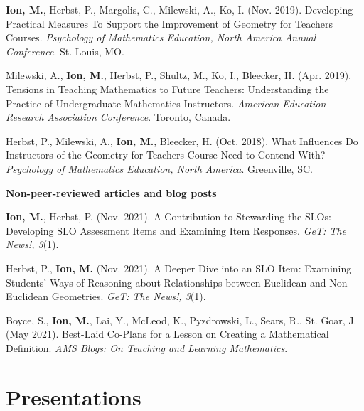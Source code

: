 \documentclass[margin,line]{res}
\newenvironment{list3}{
        \begin{list}{\ding{113}}{%
            \setlength{\itemsep}{0in}
            \setlength{\parsep}{0in} \setlength{\parskip}{0in}
            \setlength{\topsep}{0in} \setlength{\partopsep}{0in}
            \setlength{\leftmargin}{0in}
            \setlength{\rightmargin}{1.25in}}}{\end{list}}
\renewcommand{\subsection}[1]{%
      \par\vspace{3pt}%
      \underline{\normalsize\bfseries #1}%
      \par\vspace{3pt}%
    }
\begin{document}
\begin{resume}
\begin{list3}
  \item \textbf{Ion, M.}, Herbst, P., Margolis, C., Milewski, A., Ko, I. (Nov. 2019). Developing Practical Measures To Support the Improvement of Geometry for Teachers Courses. \textit{Psychology of Mathematics Education, North America Annual Conference}. St. Louis, MO. 
  \item Milewski, A., \textbf{Ion, M.}, Herbst, P., Shultz, M., Ko, I., Bleecker, H. (Apr. 2019). Tensions in Teaching Mathematics to Future Teachers: Understanding the Practice of Undergraduate Mathematics Instructors. \textit{American Education Research Association Conference}. Toronto, Canada. 
  \item Herbst, P., Milewski, A., \textbf{Ion, M.}, Bleecker, H. (Oct. 2018). What Influences Do Instructors of the Geometry for Teachers Course Need to Contend With? \textit{Psychology of Mathematics Education, North America}. Greenville, SC. 
\end{list3}
\subsection{\sc Non-peer-reviewed articles and blog posts} 
\begin{list3} 
  \item \textbf{Ion, M.}, Herbst, P. (Nov. 2021). A Contribution to Stewarding the SLOs: Developing SLO Assessment Items and Examining Item Responses. \textit{GeT: The News!, 3}(1). 
  \item Herbst, P., \textbf{Ion, M.} (Nov. 2021). A Deeper Dive into an SLO Item: Examining Students' Ways of Reasoning about Relationships between Euclidean and Non-Euclidean Geometries. \textit{GeT: The News!, 3}(1). 
  \item Boyce, S., \textbf{Ion, M.}, Lai, Y., McLeod, K., Pyzdrowski, L., Sears, R., St. Goar, J. (May 2021). Best-Laid Co-Plans for a Lesson on Creating a Mathematical Definition. \textit{AMS Blogs: On Teaching and Learning Mathematics}.
\end{list3}
\newpage
\section{\sc Presentations}


\end{resume}
\end{document}
